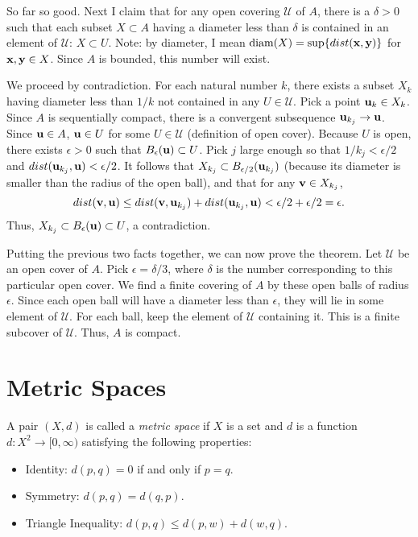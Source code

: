 \documentclass[letterpaper, twoside, 12pt]{book}
\begin{document}
\begin{solution}
    So far so good. Next I claim that for any open covering \(\mathcal U\) of
    \(A\), there is a \(\delta > 0\) such that each subset \(X \subset A\)
    having a diameter less than \(\delta\) is contained in an element 
    of \(\mathcal U\): \(X \subset U\). Note: by diameter,
    I mean \(\text{diam}(X) = \text{sup}\{dist(\mathbf x, \mathbf y)\}\) 
    for \(\mathbf x, \mathbf y \in X\). Since \(A\) is bounded, this number will
    exist.
    
    We proceed by contradiction. For each natural number \(k\), there exists
    a subset \(X_{k}\) having diameter less than \(1/k\) not contained in 
    any \(U \in \mathcal U\). Pick a point \(\mathbf u_k \in X_k\). Since \(A\)
    is sequentially compact, there is a convergent subsequence 
    \(\mathbf u_{k_j} \to \mathbf u\). Since \(\mathbf u \in A\), \(\mathbf u \in U\)
    for some \(U \in \mathcal U\) (definition of open cover). Because \(U\) is open, 
    there exists \(\epsilon > 0\) such that \(B_{\epsilon}(\mathbf u) \subset U\). 
    Pick \(j\) large enough so that \(1 / k_j < \epsilon / 2\) and 
    \(dist(\mathbf u_{k_j}, \mathbf u) < \epsilon/2 \). It follows that
    \(X_{k_{j}} \subset B_{\epsilon/2}(\mathbf u_{k_j})\) (because its diameter
    is smaller than the radius of the open ball), and that for any \(\mathbf v \in X_{k_j}\),
    \[ dist(\mathbf v, \mathbf u) \leq dist(\mathbf v, \mathbf u_{k_j}) + dist(\mathbf u_{k_j}, \mathbf u)
    < \epsilon /2 + \epsilon / 2 = \epsilon .\]
    Thus, \(X_{k_{j}} \subset B_{\epsilon}(\mathbf u) \subset U\), a contradiction.

    Putting the previous two facts together, we can now prove the theorem. Let
    \(\mathcal U\) be an open cover of \(A\). Pick \(\epsilon = \delta / 3\), where
    \(\delta\) is the number corresponding to this particular open cover. We 
    find a finite covering of \(A\) by these open balls of radius \(\epsilon\). Since
    each open ball will have a diameter less than \(\epsilon\), they will lie
    in some element of \(\mathcal U\). For each ball, keep the element of \(\mathcal U\)
    containing it. This is a finite subcover of \(\mathcal U\). Thus, \(A\) is compact.


\end{solution}




\chapter{Metric Spaces}

\begin{definition}
  A pair \((X,d)\) is called a \textit{metric space} if \(X\) is a set
  and \(d\) is a function \(d:X^2\to[0,\infty)\) satisfying the following
  properties:
  \begin{itemize}
    \item Identity: \(d(p,q)=0\) if and only if \(p=q\).
    \item Symmetry: \(d(p,q)=d(q,p)\).
    \item Triangle Inequality: \(d(p,q)\leq d(p,w)+d(w,q)\).
  \end{itemize}
\end{definition}
\end{document}
